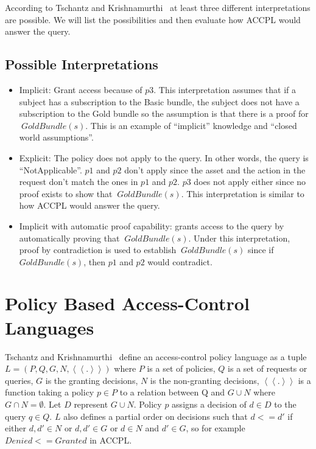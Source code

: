 According to Tschantz and Krishnamurthi~\cite{Tschantz} at least three different interpretations are possible. We will list the possibilities and then evaluate how \ac{ACCPL} would answer the query.

\subsection{Possible Interpretations}\label{sec:threeinterpretations}
\begin{itemize}
\item Implicit: Grant access because of $p3$. This interpretation assumes that if a subject has a subscription to the Basic bundle, the subject does not have a subscription to the Gold bundle so the assumption is that there is a proof for $~GoldBundle(s)$. This is an example of ``implicit'' knowledge and ``closed world assumptions''.

\item Explicit: The policy does not apply to the query. In other words, the query is ``NotApplicable''. $p1$ and $p2$ don't apply since the asset and the action in the request don't match the ones in $p1$ and $p2$. $p3$ does not apply either since no proof exists to show that $~GoldBundle(s)$. This interpretation is similar to how \ac{ACCPL} would answer the query.

\item Implicit with automatic proof capability: grants access to the query by automatically proving that $~GoldBundle(s)$. Under this interpretation, proof by contradiction is used to establish $~GoldBundle(s)$ since if $GoldBundle(s)$, then $p1$ and $p2$ would contradict.
\end{itemize}

\section{Policy Based Access-Control Languages}

Tschantz and Krishnamurthi~\cite{Tschantz} define an access-control policy language as a tuple $L = (P, Q, G, N, \left\langle\left\langle . \right\rangle\right\rangle)$ where $P$ is a set of policies, $Q$ is a set of requests or queries, $G$ is the granting decisions, $N$ is the non-granting decisions, $\left\langle\left\langle . \right\rangle\right\rangle$ is a function taking a policy $p \in P$ to a relation between Q and $G \cup N$ where $G \cap N = \emptyset$. Let $D$ represent $G \cup N$. Policy $p$ assigns a decision of $d \in D$ to the query $q \in Q$. $L$ also defines a partial order on decisions such that $d <= d'$ if either $d, d' \in N$ or $d, d' \in G$ or $d \in N$ and $d' \in G$, so for example $Denied <= Granted$ in \ac{ACCPL}.


